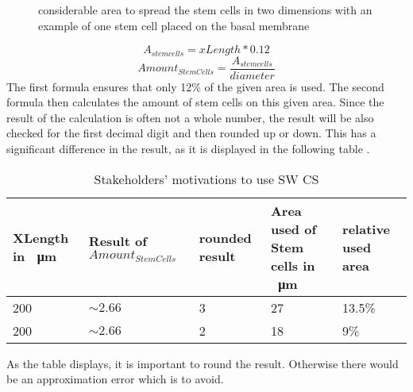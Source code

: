\begin{figure}
\begin{center}
\caption{considerable area to spread the stem cells in two dimensions with an example of one stem cell placed on the basal membrane}
\label{tikz:AreaIn3D}
\end{center}
\end{figure}




\begin{equation}
A_{stem cells} = xLength * 0.12
\end{equation}
\begin{equation}
Amount_{StemCells} = \dfrac{A_{stem cells}}{diameter} 
\end{equation}
The first formula ensures that only 12\% of the given area is used. The second formula then calculates the amount of stem cells on this given area. Since the result of the calculation is often not a whole number, the result will be also checked for the first decimal digit and then rounded up or down. This has a significant difference in the result, as it is displayed in the following table \cite{TABLEREF}.
\begin{table}[h]
\centering
\caption{Stakeholders' motivations to use \ac{SW CS}}
\renewcommand{\arraystretch}{1.5}
	\begin{tabularx}{\textwidth}{XXXXX}
		XLength in \SI{}{\micro\metre} & Result of $Amount_{StemCells}$ & rounded result & Area used of Stem cells in \SI{}{\micro\metre} & relative used area  \\
		\hline
		200 & $\sim 2.66$ & 3 & 27 & 13.5\% \\
		
		200 & $\sim 2.66$ & 2 & 18 & 9\% 

	\end{tabularx}
	\label{tbl:Approximation error}
\end{table}
As the table displays, it is important to round the result. Otherwise there would be an approximation error which is to avoid.

